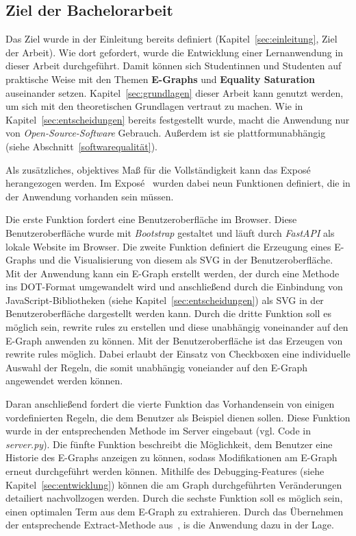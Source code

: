 \subsection{Ziel der Bachelorarbeit}\label{sub:ziel}

Das Ziel wurde in der Einleitung bereits definiert (Kapitel~\ref{sec:einleitung}, Ziel der Arbeit).
Wie dort gefordert, wurde die Entwicklung einer Lernanwendung in dieser Arbeit durchgeführt. Damit können sich Studentinnen und Studenten auf praktische Weise mit den Themen 
\textbf{E-Graphs} und \textbf{Equality Saturation} auseinander setzen. Kapitel~\ref{sec:grundlagen} dieser Arbeit kann genutzt werden, um sich mit den
theoretischen Grundlagen vertraut zu machen. 
Wie in Kapitel~\ref{sec:entscheidungen} bereits festgestellt wurde, macht die Anwendung nur von \textit{Open-Source-Software} Gebrauch. Außerdem ist
sie plattformunabhängig (siehe Abschnitt~\ref{softwarequalität}).

Als zusätzliches, objektives Maß für die Vollständigkeit kann das Exposé herangezogen werden.
Im Exposé~\cite{expose} wurden dabei neun Funktionen definiert, die in der Anwendung vorhanden sein müssen.

Die erste Funktion fordert eine Benutzeroberfläche im Browser. Diese Benutzeroberfläche wurde mit \textit{Bootstrap} gestaltet und läuft durch \textit{FastAPI} als lokale Website 
im Browser. Die zweite Funktion definiert die Erzeugung eines E-Graphs und die Visualisierung von diesem als SVG in der Benutzeroberfläche. Mit der Anwendung kann ein E-Graph erstellt
werden, der durch eine Methode ins DOT-Format umgewandelt wird und anschließend durch die Einbindung von JavaScript-Bibliotheken (siehe Kapitel~\ref{sec:entscheidungen}) als SVG in der Benutzeroberfläche dargestellt werden kann.
Durch die dritte Funktion soll es möglich sein, rewrite rules zu erstellen und diese unabhängig voneinander auf den E-Graph anwenden zu können.  
Mit der Benutzeroberfläche ist das Erzeugen von rewrite rules möglich. Dabei erlaubt der Einsatz von Checkboxen eine individuelle Auswahl der Regeln, die somit unabhängig
voneiander auf den E-Graph angewendet werden können.

Daran anschließend fordert die vierte Funktion das Vorhandensein von einigen vordefinierten Regeln, die dem Benutzer als Beispiel dienen sollen.
Diese Funktion wurde in der entsprechenden Methode im Server eingebaut (vgl. Code in \textit{server.py}).
Die fünfte Funktion beschreibt die Möglichkeit, dem Benutzer eine Historie des E-Graphs anzeigen zu können, sodass Modifikationen am E-Graph erneut durchgeführt werden können.
Mithilfe des Debugging-Features (siehe Kapitel~\ref{sec:entwicklung}) können die am Graph durchgeführten Veränderungen detailiert nachvollzogen werden.
Durch die sechste Funktion soll es möglich sein, einen optimalen Term aus dem E-Graph zu extrahieren. Durch das Übernehmen der entsprechende Extract-Methode aus~\cite{devito}, 
is die Anwendung dazu in der Lage.

